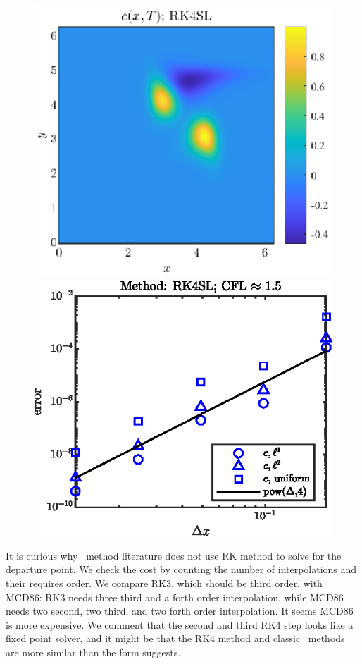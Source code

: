 \documentclass[11pt,letterpaper]{article}
\begin{document}
\begin{figure}[H]
    \centering
    \includegraphics{figs/c_final_RK4SL}
    \includegraphics{figs/conv_order_RK4SL}
    \caption{}\label{fig:c_final_RK4SL}
\end{figure}
It is curious why \sml\ method literature does not use RK method to solve for the departure point. We check the cost by counting the number of interpolations and their requires order. We compare RK3, which should be third order, with MCD86: RK3 needs three third and a forth order interpolation, while MCD86 needs two second, two third, and two forth order interpolation. It seems MCD86 is more expensive. We comment that the second and third RK4 step looks like a fixed point solver, and it might be that the RK4 method and classic \sml\ methods are more similar than the form suggests.
\end{document}
